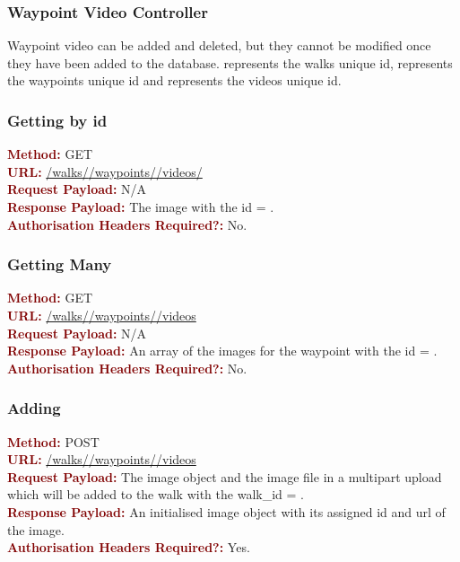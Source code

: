 \documentclass[11pt,a4paper]{report}
\begin{document}
\subsubsection{Waypoint Video Controller}
Waypoint video can be added and deleted, but they cannot be modified once they have been added to the database.  represents the walks unique id,  represents the waypoints unique id and  represents the videos unique id. 
 
\subsubsection{Getting by id}
\textbf{\textcolor{Maroon}{Method:}} GET\\
\textbf{\textcolor{Maroon}{URL:}} \url{/walks/}\url{/waypoints/}\url{/videos/}\\
\textbf{\textcolor{Maroon}{Request Payload:}} N/A\\
\textbf{\textcolor{Maroon}{Response Payload:}} The image with the id = .\\
\textbf{\textcolor{Maroon}{Authorisation Headers Required?:}} No.

\subsubsection{Getting Many}
\textbf{\textcolor{Maroon}{Method:}} GET\\
\textbf{\textcolor{Maroon}{URL:}} \url{/walks/}\url{/waypoints/}\url{/videos}\\
\textbf{\textcolor{Maroon}{Request Payload:}} N/A\\
\textbf{\textcolor{Maroon}{Response Payload:}} An array of the images for the waypoint with the id = .\\
\textbf{\textcolor{Maroon}{Authorisation Headers Required?:}} No.

\subsubsection{Adding}
\textbf{\textcolor{Maroon}{Method:}} POST\\
\textbf{\textcolor{Maroon}{URL:}} \url{/walks/}\url{/waypoints/}\url{/videos}\\
\textbf{\textcolor{Maroon}{Request Payload:}} The image object and the image file in a multipart upload which will be added to the walk with the walk\_id = .\\
\textbf{\textcolor{Maroon}{Response Payload:}} An initialised image object with its assigned id and url of the image.\\
\textbf{\textcolor{Maroon}{Authorisation Headers Required?:}} Yes.
\end{document}
